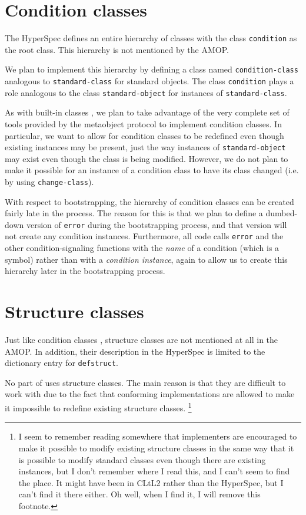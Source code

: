 \section{Condition classes}
\label{object-system-condition-classes}

The HyperSpec defines an entire hierarchy of classes with the class
\texttt{condition} as the root class.  This hierarchy is not mentioned
by the AMOP.  

We plan to implement this hierarchy by defining a class named
\texttt{condition-class} analogous to \texttt{standard-class} for
standard objects.  The class \texttt{condition} plays a role analogous
to the class \texttt{standard-object} for instances of
\texttt{standard-class}. 

As with built-in classes , we
plan to take advantage of the very complete set of tools provided by
the metaobject protocol to implement condition classes.  In
particular, we want to allow for condition classes to be redefined
even though existing instances may be present, just the way instances
of \texttt{standard-object} may exist even though the class is being
modified.  However, we do not plan to make it possible for an instance
of a condition class to have its class changed (i.e. by using
\texttt{change-class}).  

With respect to bootstrapping, the hierarchy of condition classes can
be created fairly late in the process.  The reason for this is that we
plan to define a dumbed-down version of \texttt{error} during the
bootstrapping process, and that version will not create any condition
instances.  Furthermore, all \sysname{} code calls \texttt{error} and
the other condition-signaling functions with the \emph{name} of a
condition (which is a symbol) rather than with a \emph{condition
  instance}, again to allow us to create this hierarchy later in the
bootstrapping process. 

\section{Structure classes}
\label{object-system-structure-classes}

Just like condition classes ,
structure classes are not mentioned at all in the AMOP.  In addition,
their description in the HyperSpec is limited to the dictionary entry
for \texttt{defstruct}.  

No part of \sysname{} uses structure classes.  The main reason is that
they are difficult to work with due to the fact that conforming
implementations are allowed to make it impossible to redefine
existing structure classes.%
\footnote{I seem to remember reading somewhere that implementers are
  encouraged to make it possible to modify existing structure classes
  in the same way that it is possible to modify standard classes even
  though there are existing instances, but I don't remember where I
  read this, and I can't seem to find the place.  It might have been
  in CLtL2 rather than the HyperSpec, but I can't find it there
  either.  Oh well, when I find it, I will remove this footnote.}

